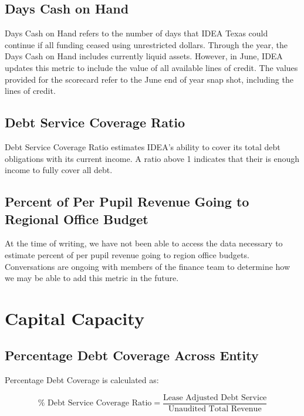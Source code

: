 \documentclass[
  letterpaper,
  DIV=11,
  numbers=noendperiod]{scrreprt}
\begin{document}
\section{Days Cash on Hand}\label{sec-DaysCash}

Days Cash on Hand refers to the number of days that IDEA Texas could
continue if all funding ceased using unrestricted dollars. Through the
year, the Days Cash on Hand includes currently liquid assets. However,
in June, IDEA updates this metric to include the value of all available
lines of credit. The values provided for the scorecard refer to the June
end of year snap shot, including the lines of credit.

\section{Debt Service Coverage Ratio}\label{sec-DebtRatio}

Debt Service Coverage Ratio estimates IDEA's ability to cover its total
debt obligations with its current income. A ratio above 1 indicates that
their is enough income to fully cover all debt.

\section{Percent of Per Pupil Revenue Going to Regional Office
Budget}\label{sec-PerPupil}

At the time of writing, we have not been able to access the data
necessary to estimate percent of per pupil revenue going to region
office budgets. Conversations are ongoing with members of the finance
team to determine how we may be able to add this metric in the future.


\chapter{Capital Capacity}\label{sec-Capital}

\section{Percentage Debt Coverage Across Entity}\label{sec-DebtCov}

Percentage Debt Coverage is calculated as:

\[\% \text{ Debt Service Coverage Ratio} = \frac{\text{Lease Adjusted Debt Service}}{\text{Unaudited Total Revenue}} \]
\end{document}
